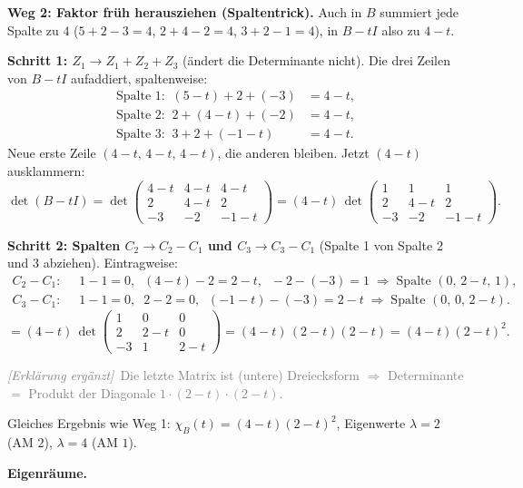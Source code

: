 \documentclass[a4paper,12pt]{article}
\newcommand{\erglerk}{\textcolor{gray}{\small\textit{[Erkl\"arung erg\"anzt]}}}
\newcommand{\EW}{Eigenwert}
\begin{document}
\textbf{Weg 2: Faktor fr\"uh herausziehen (Spaltentrick).} Auch in $B$ summiert jede Spalte zu $4$ ($5+2-3=4$, $2+4-2=4$, $3+2-1=4$), in $B - tI$ also zu $4 - t$.

\textbf{Schritt 1: $Z_1 \to Z_1 + Z_2 + Z_3$} (\"andert die Determinante nicht). Die drei Zeilen von $B - tI$ aufaddiert, spaltenweise:
\begin{align*}
\text{Spalte 1:}\;\; (5-t) + 2 + (-3) &= 4 - t, \\
\text{Spalte 2:}\;\; 2 + (4-t) + (-2) &= 4 - t, \\
\text{Spalte 3:}\;\; 3 + 2 + (-1-t) &= 4 - t.
\end{align*}
Neue erste Zeile $(4-t,\, 4-t,\, 4-t)$, die anderen bleiben. Jetzt $(4-t)$ ausklammern:
\[
\det(B - tI) = \det\!\begin{pmatrix} 4-t & 4-t & 4-t \\ 2 & 4-t & 2 \\ -3 & -2 & -1-t \end{pmatrix}
= (4-t)\,\det\!\begin{pmatrix} 1 & 1 & 1 \\ 2 & 4-t & 2 \\ -3 & -2 & -1-t \end{pmatrix}.
\]

\textbf{Schritt 2: Spalten $C_2 \to C_2 - C_1$ und $C_3 \to C_3 - C_1$} (Spalte 1 von Spalte 2 und 3 abziehen). Eintragweise:
\begin{align*}
C_2 - C_1:\;\; & 1-1 = 0,\;\; (4-t)-2 = 2-t,\;\; -2-(-3) = 1 \;\Rightarrow\; \text{Spalte } (0,\, 2-t,\, 1), \\
C_3 - C_1:\;\; & 1-1 = 0,\;\; 2-2 = 0,\;\; (-1-t)-(-3) = 2-t \;\Rightarrow\; \text{Spalte } (0,\, 0,\, 2-t).
\end{align*}
\[
= (4-t)\,\det\!\begin{pmatrix} 1 & 0 & 0 \\ 2 & 2-t & 0 \\ -3 & 1 & 2-t \end{pmatrix}
= (4-t)\,(2-t)(2-t) = (4-t)(2-t)^2.
\]

\erglerk\ \textcolor{gray}{\small Die letzte Matrix ist (untere) Dreiecksform $\Rightarrow$ Determinante $=$ Produkt der Diagonale $1\cdot(2-t)\cdot(2-t)$.}

Gleiches Ergebnis wie Weg 1: $\chi_B(t) = (4-t)(2-t)^2$, \EW{}e $\lambda = 2$ (AM $2$), $\lambda = 4$ (AM $1$).

\medskip
\textbf{Eigenr\"aume.}
\end{document}
